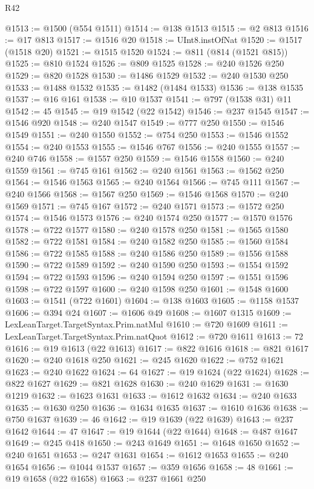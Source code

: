 \begin{lexlean}{R42}
\begin{coremodule}
@1513 := @1500 (@554 @1511)
@1514 := @138 @1513
@1515 := @2 @813
@1516 := @17 @813
@1517 := @1516 @20
@1518 := UInt8.instOfNat
@1520 := @1517 (@1518 @20)
@1521 := @1515 @1520
@1524 := @811 (@814 (@1521 @815))
@1525 := @810 @1524
@1526 := @809 @1525
@1528 := @240 @1526 @250
@1529 := @820 @1528
@1530 := @1486 @1529
@1532 := @240 @1530 @250
@1533 := @1488 @1532
@1535 := @1482 (@1484 @1533)
@1536 := @138 @1535
@1537 := @16 @161
@1538 := @10 @1537
@1541 := @797 (@1538 @31) @11
@1542 := 45
@1545 := @19 @1542 (@22 @1542)
@1546 := @237 @1545
@1547 := @1546 @920
@1548 := @240 @1547
@1549 := @777 @250
@1550 := @1546 @1549
@1551 := @240 @1550
@1552 := @754 @250
@1553 := @1546 @1552
@1554 := @240 @1553
@1555 := @1546 @767
@1556 := @240 @1555
@1557 := @240 @746
@1558 := @1557 @250
@1559 := @1546 @1558
@1560 := @240 @1559
@1561 := @745 @161
@1562 := @240 @1561
@1563 := @1562 @250
@1564 := @1546 @1563
@1565 := @240 @1564
@1566 := @745 @111
@1567 := @240 @1566
@1568 := @1567 @250
@1569 := @1546 @1568
@1570 := @240 @1569
@1571 := @745 @167
@1572 := @240 @1571
@1573 := @1572 @250
@1574 := @1546 @1573
@1576 := @240 @1574 @250
@1577 := @1570 @1576
@1578 := @722 @1577
@1580 := @240 @1578 @250
@1581 := @1565 @1580
@1582 := @722 @1581
@1584 := @240 @1582 @250
@1585 := @1560 @1584
@1586 := @722 @1585
@1588 := @240 @1586 @250
@1589 := @1556 @1588
@1590 := @722 @1589
@1592 := @240 @1590 @250
@1593 := @1554 @1592
@1594 := @722 @1593
@1596 := @240 @1594 @250
@1597 := @1551 @1596
@1598 := @722 @1597
@1600 := @240 @1598 @250
@1601 := @1548 @1600
@1603 := @1541 (@722 @1601)
@1604 := @138 @1603
@1605 := @1158 @1537
@1606 := @394 @24
@1607 := @1606 @49
@1608 := @1607 @1315
@1609 := LexLeanTarget.TargetSyntax.Prim.natMul
@1610 := @720 @1609
@1611 := LexLeanTarget.TargetSyntax.Prim.natQuot
@1612 := @720 @1611
@1613 := 72
@1616 := @19 @1613 (@22 @1613)
@1617 := @822 @1616
@1618 := @821 @1617
@1620 := @240 @1618 @250
@1621 := @245 @1620
@1622 := @752 @1621
@1623 := @240 @1622
@1624 := 64
@1627 := @19 @1624 (@22 @1624)
@1628 := @822 @1627
@1629 := @821 @1628
@1630 := @240 @1629
@1631 := @1630 @1219
@1632 := @1623 @1631
@1633 := @1612 @1632
@1634 := @240 @1633
@1635 := @1630 @250
@1636 := @1634 @1635
@1637 := @1610 @1636
@1638 := @750 @1637
@1639 := 46
@1642 := @19 @1639 (@22 @1639)
@1643 := @237 @1642
@1644 := 47
@1647 := @19 @1644 (@22 @1644)
@1648 := @487 @1647
@1649 := @245 @418
@1650 := @243 @1649
@1651 := @1648 @1650
@1652 := @240 @1651
@1653 := @247 @1631
@1654 := @1612 @1653
@1655 := @240 @1654
@1656 := @1044 @1537
@1657 := @359 @1656
@1658 := 48
@1661 := @19 @1658 (@22 @1658)
@1663 := @237 @1661 @250

\end{coremodule}
\end{lexlean}
